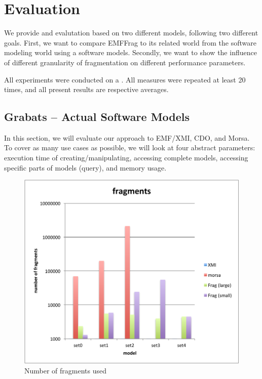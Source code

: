 \section{Evaluation}

We provide and evalutation based on two different models, following two different goals. First, we want to compare EMFFrag to its related world from the software modeling world using a software models. Secondly, we want to show the influence of different granularity of fragmentation on different performance parameters.

All experiments were conducted on a . All measures were repeated at least 20 times, and all present results are respective averages.

\subsection{Grabats -- Actual Software Models}

In this section, we will evaluate our approach to EMF/XMI, CDO, and Morsa. To cover as many use cases as possible, we will look at four abstract parameters: execution time of creating/manipulating, accessing complete models, accessing specific parts of models (query), and memory usage.

\begin{figure}
  \centering
  \includegraphics[width=0.65\linewidth]{figures/grabatsFragments}
  \caption{Number of fragments used}
  \label{fig:grabatsFragments}
\end{figure}

